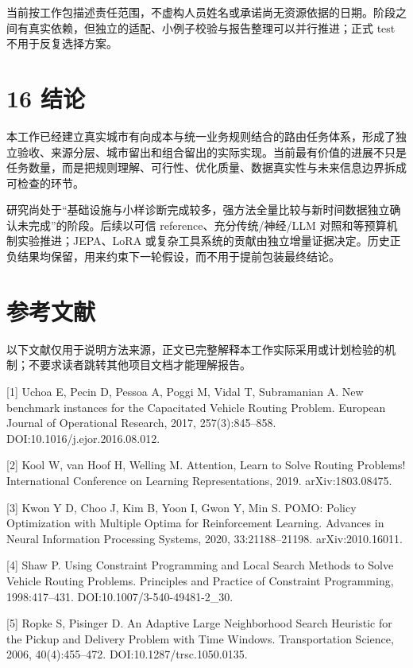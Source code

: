 \documentclass[UTF8,10pt,a4paper,fontset=fandol]{ctexart}
\begin{document}
当前按工作包描述责任范围，不虚构人员姓名或承诺尚无资源依据的日期。阶段之间有真实依赖，但独立的适配、小例子校验与报告整理可以并行推进；正式 test 不用于反复选择方案。


\section*{16 结论}


本工作已经建立真实城市有向成本与统一业务规则结合的路由任务体系，形成了独立验收、来源分层、城市留出和组合留出的实际实现。当前最有价值的进展不只是任务数量，而是把规则理解、可行性、优化质量、数据真实性与未来信息边界拆成可检查的环节。


研究尚处于“基础设施与小样诊断完成较多，强方法全量比较与新时间数据独立确认未完成”的阶段。后续以可信 reference、充分传统/\allowbreak{}神经/\allowbreak{}LLM 对照和等预算机制实验推进；JEPA、LoRA 或复杂工具系统的贡献由独立增量证据决定。历史正负结果均保留，用来约束下一轮假设，而不用于提前包装最终结论。


\section*{参考文献}


以下文献仅用于说明方法来源，正文已完整解释本工作实际采用或计划检验的机制；不要求读者跳转其他项目文档才能理解报告。


[1] Uchoa E, Pecin D, Pessoa A, Poggi M, Vidal T, Subramanian A. New benchmark instances for the Capacitated Vehicle Routing Problem. European Journal of Operational Research, 2017, 257(3):845–858. DOI:10.1016/\allowbreak{}j.ejor.2016.08.012.


[2] Kool W, van Hoof H, Welling M. Attention, Learn to Solve Routing Problems! International Conference on Learning Representations, 2019. arXiv:1803.08475.


[3] Kwon Y D, Choo J, Kim B, Yoon I, Gwon Y, Min S. POMO: Policy Optimization with Multiple Optima for Reinforcement Learning. Advances in Neural Information Processing Systems, 2020, 33:21188–21198. arXiv:2010.16011.


[4] Shaw P. Using Constraint Programming and Local Search Methods to Solve Vehicle Routing Problems. Principles and Practice of Constraint Programming, 1998:417–431. DOI:10.1007/\allowbreak{}3-540-49481-2\_\allowbreak{}30.


[5] Ropke S, Pisinger D. An Adaptive Large Neighborhood Search Heuristic for the Pickup and Delivery Problem with Time Windows. Transportation Science, 2006, 40(4):455–472. DOI:10.1287/\allowbreak{}trsc.1050.0135.
\end{document}
